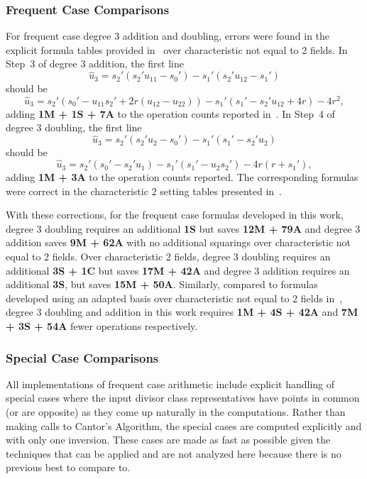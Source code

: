 \subsubsection{Frequent Case Comparisons}
For frequent case degree 3 addition and doubling, errors were found in the
explicit formula tables provided in~\cite{rad2019jacobian} over characteristic
not equal to 2 fields. In Step~3 of degree 3 addition, the first line $$\hat{u}_3
= s_2'(s_2'u_{11} - s_0') - s_1'(s_2'u_{12} - s_1')$$ should be $$\hat{u}_3 =
s_2'(s_0' - u_{11}s_2' + 2r(u_{12} - u_{22})) - s_1'(s_1' - s_2'u_{12} + 4r) -
4r^2,$$ adding \textbf{1M + 1S + 7A} to the operation counts reported
in~\cite{rad2019jacobian}. In Step~4 of degree 3 doubling, the first line
$$\hat{u}_3 = s_2'(s_2'u_2 - s_0') - s_1'(s_1' - s_2'u_2)$$ should be
$$\hat{u}_3 = s_2'(s_0' - s_2'u_1) - s_1'(s_1' - u_2s_2') - 4r(r + s_1'),$$
adding \textbf{1M + 3A} to the operation counts reported. The corresponding
formulas were correct in the characteristic 2 setting tables presented
in~\cite{rad2019jacobian}.

With these corrections, for the frequent case formulas developed in this work,
degree 3 doubling requires an additional \textbf{1S} but saves \textbf{12M +
79A} and degree 3 addition saves \textbf{9M + 62A} with no additional
squarings over characteristic not equal to 2 fields. Over
characteristic 2 fields, degree 3 doubling requires an additional \textbf{3S +
1C} but saves \textbf{17M + 42A} and degree 3 addition requires an additional
\textbf{3S}, but saves \textbf{15M + 50A}.  Similarly, compared to formulas
developed using an adapted basis over characteristic not equal to 2 fields
in~\cite{Sutherland_g3_2019}, degree 3 doubling and addition in this work
requires \textbf{1M + 4S + 42A} and \textbf{7M + 3S + 54A} fewer operations
respectively.

\subsubsection{Special Case Comparisons}
All implementations of frequent case arithmetic include explicit handling of
special cases where the input divisor class representatives have points in
common (or are opposite) as they come up naturally in the computations. Rather
than making calls to Cantor's Algorithm, the special cases are computed
explicitly and with only one inversion. These cases are made as fast as possible
given the techniques that can be applied and are not analyzed here because there
is no previous best to compare to.

